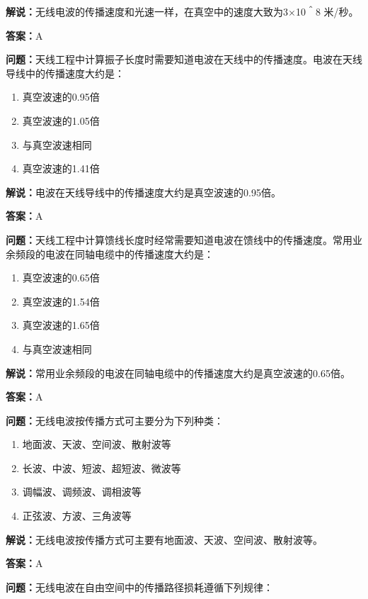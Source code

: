 \documentclass[UTF8]{ctexbook}
\begin{document}
\textbf{解说：}无线电波的传播速度和光速一样，在真空中的速度大致为3×10＾8 米/秒。%

\textbf{答案：}A

\textbf{问题：}天线工程中计算振子长度时需要知道电波在天线中的传播速度。电波在天线导线中的传播速度大约是：

\begin{enumerate}[label=\Alph*), leftmargin=3em]
  \item 真空波速的0.95倍
  \item 真空波速的1.05倍
  \item 与真空波速相同
  \item 真空波速的1.41倍
\end{enumerate}

\textbf{解说：}电波在天线导线中的传播速度大约是真空波速的0.95倍。%

\textbf{答案：}A

\textbf{问题：}天线工程中计算馈线长度时经常需要知道电波在馈线中的传播速度。常用业余频段的电波在同轴电缆中的传播速度大约是：

\begin{enumerate}[label=\Alph*), leftmargin=3em]
  \item 真空波速的0.65倍
  \item 真空波速的1.54倍
  \item 真空波速的1.65倍
  \item 与真空波速相同
\end{enumerate}

\textbf{解说：}常用业余频段的电波在同轴电缆中的传播速度大约是真空波速的0.65倍。%

\textbf{答案：}A

\textbf{问题：}无线电波按传播方式可主要分为下列种类：

\begin{enumerate}[label=\Alph*), leftmargin=3em]
  \item 地面波、天波、空间波、散射波等
  \item 长波、中波、短波、超短波、微波等
  \item 调幅波、调频波、调相波等
  \item 正弦波、方波、三角波等
\end{enumerate}

\textbf{解说：}无线电波按传播方式可主要有地面波、天波、空间波、散射波等。%

\textbf{答案：}A

\textbf{问题：}无线电波在自由空间中的传播路径损耗遵循下列规律：
\end{document}
